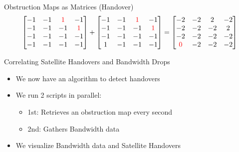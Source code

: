 \documentclass[NET,english,beameralt]{tumbeamer}
\begin{document}
\begin{frame}{Obstruction Maps as Matrices (Handover)}
    $$\begin{bmatrix}
        -1 & -1 & \color{red}1 &           -1          \\
        -1 & -1 &           -1 & \color{red}1          \\
        -1 & -1 &           -1 &           -1          \\
        -1 & -1 &           -1 &           -1          \\
    \end{bmatrix}
    +
    \begin{bmatrix}
        -1 & -1 & \color{red}1 &           -1          \\
        -1 & -1 &           -1 & \color{red}1          \\
        -1 & -1 &           -1 &           -1          \\
        1 & -1 &            -1 &           -1          \\
    \end{bmatrix}
    =
    \begin{bmatrix}
        -2           & -2 & 2 &  -2                    \\
        -2           & -2 & -2 &  2                    \\
        -2           & -2 & -2 & -2                    \\
        \color{red}0 & -2 & -2 & -2                    \\
    \end{bmatrix}$$
\end{frame}

\begin{frame}[fragile]{Correlating Satellite Handovers and Bandwidth Drops}
    \begin{itemize}
        \item We now have an algorithm to detect handovers
        \item We run 2 scripts in parallel:
            \begin{itemize}
                \item 1st: Retrieves an obstruction map every second
                \item 2nd: Gathers Bandwidth data
            \end{itemize} 
        \item We visualize Bandwidth data and Satellite Handovers 
    \end{itemize}
\end{frame}
\end{document}
